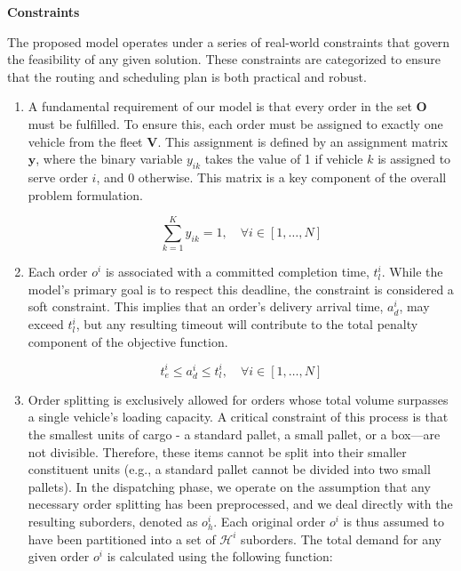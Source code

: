 \documentclass[preprint,12pt]{elsarticle}
\begin{document}
\textbf{Constraints}

The proposed model operates under a series of real-world constraints that govern the feasibility of any given solution. These constraints are categorized to ensure that the routing and scheduling plan is both practical and robust.

\begin{enumerate}
    \item A fundamental requirement of our model is that every order in the set $\textbf{O}$ must be fulfilled. To ensure this, each order must be assigned to exactly one vehicle from the fleet $\textbf{V}$. This assignment is defined by an assignment matrix $\textbf{y}$, where the binary variable $y_{ik}$ takes the value of 1 if vehicle $k$ is assigned to serve order $i$, and 0 otherwise. This matrix is a key component of the overall problem formulation.

\begin{equation}
    \sum_{k=1}^K y_{ik} = 1, \quad \forall i \in [1, \dots , N]
\end{equation}
    
    \item Each order $o^i$ is associated with a committed completion time, $t_l^i$. While the model's primary goal is to respect this deadline, the constraint is considered a soft constraint. This implies that an order's delivery arrival time, $a_d^i$, may exceed $t_l^i$, but any resulting timeout will contribute to the total penalty component of the objective function. 

\begin{equation}
    t_e ^i \leq a_d^i \leq t_l^i, \quad \forall i \in [1 , \dots,  N]
\end{equation}

    \item Order splitting is exclusively allowed for orders whose total volume surpasses a single vehicle's loading capacity. A critical constraint of this process is that the smallest units of cargo - a standard pallet, a small pallet, or a box—are not divisible. Therefore, these items cannot be split into their smaller constituent units (e.g., a standard pallet cannot be divided into two small pallets). In the dispatching phase, we operate on the assumption that any necessary order splitting has been preprocessed, and we deal directly with the resulting suborders, denoted as $o^i_h$. Each original order $o^i$ is thus assumed to have been partitioned into a set of $\mathcal{H} ^i$ suborders. The total demand for any given order $o^i$ is calculated using the following function:


\end{enumerate}
\end{document}
